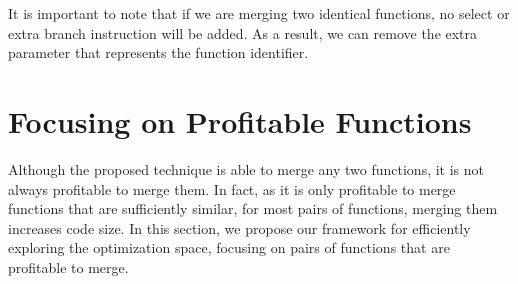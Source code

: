 It is important to note that if we are merging two identical functions, no
select or extra branch instruction will be added.
As a result, we can remove the extra parameter that represents the function
identifier.

\section{Focusing on Profitable Functions}
\label{sec:framework}


Although the proposed technique is able to merge any two functions, it is not always profitable to merge them. In fact, as it is only
profitable to merge functions that are sufficiently similar, for most pairs of functions, merging them increases code size.
In this section, we propose our framework for efficiently exploring the
optimization space, focusing on pairs of functions that are profitable to merge. 



